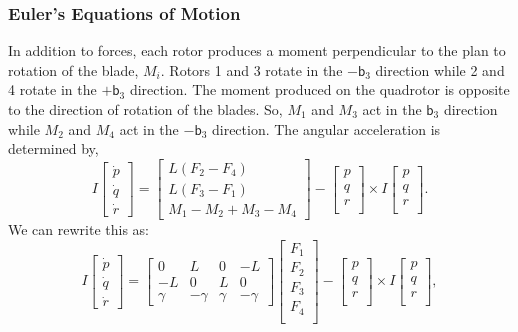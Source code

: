 \documentclass[conference,onecolumn,10pt]{IEEEtran}
\begin{document}
\subsubsection{Euler's Equations of Motion}
In addition to forces, each rotor produces a moment perpendicular to the plan to rotation of the blade, $M_i$. Rotors 1 and 3 rotate in the $-\mathsf{b}_3$ direction while 2 and 4 rotate in the $+\mathsf{b}_3$ direction. The moment produced on the quadrotor is opposite to the direction of rotation of the blades. So, $M_1$ and $M_3$ act in the $\mathsf{b}_3$ direction while $M_2$ and $M_4$ act in the $-\mathsf{b}_3$ direction. The angular acceleration is determined by, 
\begin{equation}
\label{ELEq}
I\begin{bmatrix}
\dot{p}\\
\dot{q} \\
\dot{r}
\end{bmatrix} = \begin{bmatrix}
L(F_2-F_4) \\
L(F_3-F_1)\\
M_1-M_2+M_3-M_4
\end{bmatrix} - \begin{bmatrix}
p\\
q\\
r\\
\end{bmatrix}\times I  \begin{bmatrix}
p\\
q\\
r\\
\end{bmatrix}.
\end{equation}
We can rewrite this as: 
\begin{equation}
\label{ELEq}
I\begin{bmatrix}
\dot{p}\\
\dot{q} \\
\dot{r}
\end{bmatrix} = \begin{bmatrix}
0 & L & 0 & -L \\
-L & 0 & L & 0 \\
\gamma & -\gamma & \gamma & -\gamma
\end{bmatrix}\begin{bmatrix}
F_1\\
F_2\\
F_3\\
F_4 \\
\end{bmatrix} - \begin{bmatrix}
p\\
q\\
r\\
\end{bmatrix}\times I  \begin{bmatrix}
p\\
q\\
r\\
\end{bmatrix},
\end{equation}
\end{document}
